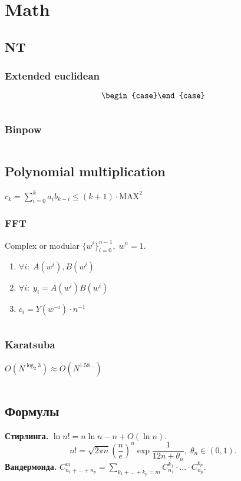 \section{Math}

\subsection{NT}
\subsubsection{Extended euclidean}
$$\begin{case}\end{case}$$
\inputminted{cpp}{../code/math/egcd.cpp}
\subsubsection{Binpow}
\inputminted{cpp}{../code/math/binpow.cpp}

\subsection{Polynomial multiplication}
$c_k=\displaystyle\sum_{i=0}^ka_ib_{k-i}\le(k+1)\cdot\text{MAX}^2$

\subsubsection{FFT}
Complex or modular $\{w^i\}_{i=0}^{n-1},\;w^n=1$.
\begin{enumerate}
\item $\forall i:\;A(w^i),B(w^i)$
\item $\forall i:\;y_i=A(w^i)B(w^i)$
\item $c_i=Y(w^{-i})\cdot n^{-1}$
\end{enumerate}
\inputminted{cpp}{../code/math/fft.cpp}
\subsubsection{Karatsuba}
$O(N^{\log_2 3})\approx O(N^{1.58\dots})$
\inputminted{cpp}{../code/math/karatsuba.cpp}

\subsection{Формулы}
\textbf{Стирлинга.} $\ln n!=n\ln n-n+O(\ln n).$
$$n!=\sqrt{2\pi n}\left(\dfrac{n}{e}\right)^n\exp\dfrac{1}{12n+\theta_n},\;\theta_n\in(0,1).$$
\textbf{Вандермонда.} $C_{n_1+\dots+n_p}^m=\displaystyle\sum_{k_1+\dots+k_p=m}C_{n_1}^{k_1}\cdot\ldots\cdot C_{n_p}^{k_p}$.

